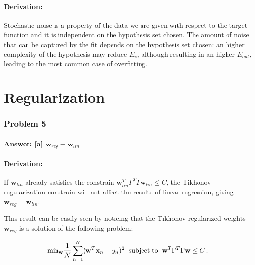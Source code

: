 \documentclass[11pt]{article}
\begin{document}
\hypertarget{derivation}{%
\subsection{Derivation:}\label{derivation}}

Stochastic noise is a property of the data we are given with respect to
the target function and it is independent on the hypothesis set chosen.
The amount of noise that can be captured by the fit depends on the
hypothesis set chosen: an higher complexity of the hypothesis may reduce
\(E_{in}\) although resulting in an higher \(E_{out}\), leading to the
most common case of overfitting.

    \hypertarget{regularization}{%
\part{Regularization}\label{regularization}}

\hypertarget{problem-5}{%
\section{Problem 5}\label{problem-5}}

\hypertarget{answer-a-mathbfw_regmathbfw_lin}{%
\subsection{\texorpdfstring{Answer: {[}a{]}
\(\mathbf{w}_{reg}=\mathbf{w}_{lin}\)}{Answer: {[}a{]} \textbackslash{}mathbf\{w\}\_\{reg\}=\textbackslash{}mathbf\{w\}\_\{lin\}}}\label{answer-a-mathbfw_regmathbfw_lin}}

\hypertarget{derivation}{%
\subsection{Derivation:}\label{derivation}}

If \(\mathbf{w}_{lin}\) already satisfies the constrain
\(\mathbf{w}_{lin}^T\Gamma^T\Gamma\mathbf{w}_{lin}\le C\), the Tikhonov
regularization constrain will not affect the results of linear
regression, giving \(\mathbf{w}_{reg}=\mathbf{w}_{lin}\).

This result can be easily seen by noticing that the Tikhonov regularized
weights \(\mathbf{w}_{reg}\) is a solution of the following problem:

\begin{equation}
{\rm min}_\mathbf{w} \frac{1}{N}\sum_{n=1}^N(\mathbf{w}^T\mathbf{x}_n-y_n)^2 \;\; {\rm subject \; to} \;\; \mathbf{w}^T\Gamma^T\Gamma\mathbf{w}\le C\,.
\end{equation}
\end{document}
